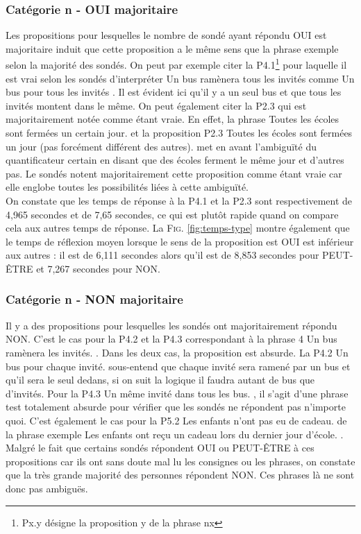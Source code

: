 \documentclass[11pt,letterpaper]{article}
\begin{document}
\subsubsection{Catégorie n - \og OUI \fg{} majoritaire}

Les propositions pour lesquelles le nombre de sondé ayant répondu OUI est majoritaire induit que cette proposition a le même sens que la phrase exemple selon la majorité des sondés. On peut par exemple citer la P4.1\footnote{Px.y désigne la proposition y de la phrase n\degres x} pour laquelle il est vrai selon les sondés d'interpréter \og Un bus ramènera tous les invités \fg{} comme \og Un bus pour tous les invités \fg{}. Il est évident ici qu'il y a un seul bus et que tous les invités montent dans le même. On peut également citer la P2.3 qui est majoritairement notée comme étant vraie. En effet, la phrase \og Toutes les écoles sont fermées un certain jour. \fg{} et la proposition P2.3 \og Toutes les écoles sont fermées un jour (pas forcément différent des autres). \fg{} met en avant l'ambiguïté du quantificateur \og certain \fg{} en disant que des écoles ferment le même jour et d'autres pas. Le sondés notent majoritairement cette proposition comme étant vraie car elle englobe toutes les possibilités liées à cette ambiguïté.\\

On constate que les temps de réponse à la P4.1 et la P2.3 sont respectivement de 4,965 secondes et de 7,65 secondes, ce qui est plutôt rapide quand on compare cela aux autres temps de réponse. La \textsc{Fig. }\ref{fig:temps-type} montre également que le temps de réflexion moyen lorsque le sens de la proposition est OUI est inférieur aux autres : il est de 6,111 secondes alors qu'il est de 8,853 secondes pour PEUT-ÊTRE et 7,267 secondes pour NON.

\vspace{7px}

\subsubsection{Catégorie n - \og NON \fg{} majoritaire}

Il y a des propositions pour lesquelles les sondés ont majoritairement répondu NON. C'est le cas pour la P4.2 et la P4.3 correspondant à la phrase 4 \og Un bus ramènera les invités. \fg{}. Dans les deux cas, la proposition est absurde. La P4.2 \og Un bus pour chaque invité. \fg{} sous-entend que chaque invité sera ramené par un bus et qu'il sera le seul dedans, si on suit la logique il faudra autant de bus que d'invités. Pour la P4.3 \og Un même invité dans tous les bus. \fg{}, il s'agit d'une phrase test totalement absurde pour vérifier que les sondés ne répondent pas n'importe quoi. C'est également le cas pour la P5.2 \og Les enfants n’ont pas eu de cadeau. \fg{} de la phrase exemple \og Les enfants ont reçu un cadeau lors du dernier jour d’école. \fg{}. Malgré le fait que certains sondés répondent OUI ou PEUT-ÊTRE à ces propositions car ils ont sans doute mal lu les consignes ou les phrases, on constate que la très grande majorité des personnes répondent NON. Ces phrases là ne sont donc pas ambiguës.\\
\end{document}

